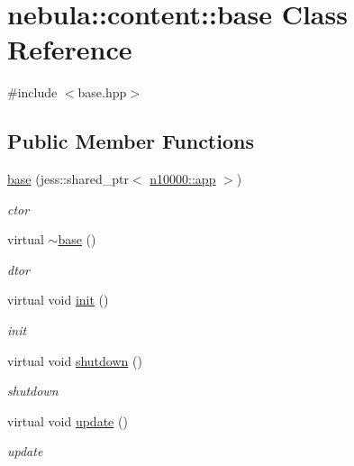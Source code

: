 \hypertarget{classnebula_1_1content_1_1base}{
\section{nebula::content::base Class Reference}
\label{classnebula_1_1content_1_1base}
}


{\ttfamily \#include $<$base.hpp$>$}\subsection*{Public Member Functions}
\begin{DoxyCompactItemize}
\item 
\hyperlink{classnebula_1_1content_1_1base_a32215d003add862cb1cf255aca714006}{base} (jess::shared\_\-ptr$<$ \hyperlink{classnebula_1_1framework_1_1app}{n10000::app} $>$)
\begin{DoxyCompactList}\small\item\em ctor \item\end{DoxyCompactList}\item 
virtual \hyperlink{classnebula_1_1content_1_1base_ae80fb05ce9451bad1903e5f931cef3ad}{$\sim$base} ()
\begin{DoxyCompactList}\small\item\em dtor \item\end{DoxyCompactList}\item 
virtual void \hyperlink{classnebula_1_1content_1_1base_aca3fd85e0ad782b7d2e1d1a80eef0356}{init} ()
\begin{DoxyCompactList}\small\item\em init \item\end{DoxyCompactList}\item 
virtual void \hyperlink{classnebula_1_1content_1_1base_a158481f095aa9c6d6cb550b9422e5e51}{shutdown} ()
\begin{DoxyCompactList}\small\item\em shutdown \item\end{DoxyCompactList}\item 
virtual void \hyperlink{classnebula_1_1content_1_1base_ad000db68eff36d8c55edfb97e37f83a6}{update} ()
\begin{DoxyCompactList}\small\item\em update \item\end{DoxyCompactList}\item 

\end{DoxyCompactItemize}
